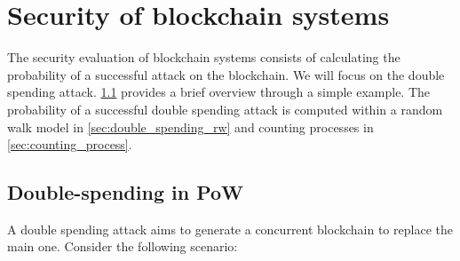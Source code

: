 \chapter{Security of blockchain systems}\label{chap:security}
The security evaluation of blockchain systems consists of calculating the probability of a successful attack on the blockchain. We will focus on the double spending attack. \cref{sec:double_spending} provides a brief overview through a simple example. The probability of a successful double spending attack is computed within a random walk model in \cref{sec:double_spending_rw} and counting processes in \cref{sec:counting_process}.

\section{Double-spending in PoW}\label{sec:double_spending}
A double spending attack aims to generate a concurrent blockchain to replace the main one. Consider the following scenario:

